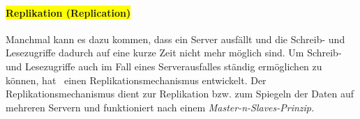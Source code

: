 \paragraph{\colorbox{yellow}{Replikation (Replication)}}\label{replication}
Manchmal kann es dazu kommen, dass ein Server ausfällt und die Schreib- und Lesezugriffe dadurch auf eine kurze Zeit nicht mehr möglich sind. Um Schreib- und Lesezugriffe auch im Fall eines Serverausfalles ständig ermöglichen zu können, hat \mongo\ einen Replikationsmechanismus entwickelt. Der Replikationsmechanismus dient zur Replikation bzw. zum Spiegeln der Daten auf mehreren Servern und funktioniert nach einem \textit{Master-n-Slaves-Prinzip.}
